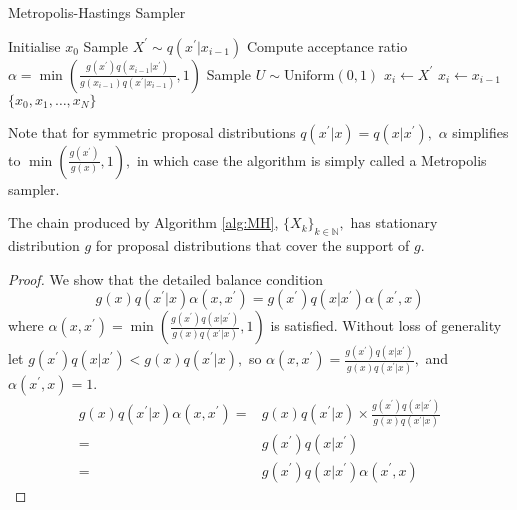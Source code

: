 \begin{algorithm}[htbp]
    \caption{Metropolis-Hastings Sampler}
    \label{alg:MH}
    \begin{algorithmic}
        \State Initialise $x_0$
        \State Sample $X^\prime \sim q(x^\prime|x_{i - 1})$
        \State Compute acceptance ratio
        $\alpha
            = \min\left(
            \frac{
            g(x^\prime) q(x_{i - 1}|x^\prime)
            }{
            g(x_{i - 1}) q(x^\prime|x_{i - 1})
            },
            1
            \right)$
        \State Sample $U \sim \text{Uniform}(0, 1)$
        \State $x_i \gets X^\prime$
        \Else
        \State $x_i \gets x_{i-1}$
        \EndIf
        \EndFor
        \State \Return $\{x_0, x_1, \dots, x_N\}$
    \end{algorithmic}
\end{algorithm}

Note that for symmetric proposal distributions $q(x^\prime|x) = q(x|x^\prime),$
$\alpha$ simplifies to $\min\left(\frac{g(x^\prime)}{g(x)}, 1\right),$ in
which case the algorithm is simply called a Metropolis sampler.

\begin{theorem}
    The chain produced by Algorithm \ref{alg:MH}, $\{X_k\}_{k\in \mathbb{N}},$
    has stationary distribution $g$ for proposal distributions that cover the
    support of $g.$
\end{theorem}

\begin{proof}
    We show that the detailed balance condition
    $$
        g(x)q(x^\prime | x)\alpha(x, x^\prime)
        =g(x^\prime)q(x | x^\prime)\alpha(x^\prime, x)
    $$
    where $\alpha(x, x^\prime) = \min\left(
        \frac{
                g(x^\prime) q(x|x^\prime)
            }{
                g(x) q(x^\prime|x)
            },
        1
        \right)$
    is satisfied. Without loss of generality let
    $g(x^\prime) q(x|x^\prime) < g(x) q(x^\prime|x),$ so
    $\alpha(x, x^\prime) = \frac{
            g(x^\prime) q(x|x^\prime)
        }{
            g(x) q(x^\prime|x)
        },$ and $\alpha(x^\prime, x) = 1.$
    \begin{align*}
        g(x)q(x^\prime | x)\alpha(x, x^\prime)
        = & g(x)q(x^\prime | x) \times \frac{
            g(x^\prime) q(x|x^\prime)
        }{
            g(x) q(x^\prime|x)
        }                                                \\
        = & g(x^\prime) q(x|x^\prime)                    \\
        = & g(x^\prime) q(x|x^\prime)\alpha(x^\prime, x)
    \end{align*}
\end{proof}

